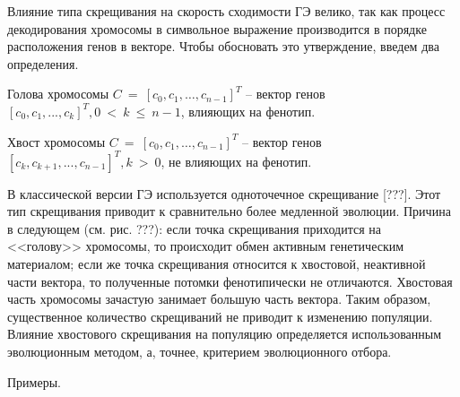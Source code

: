 Влияние типа скрещивания на скорость сходимости ГЭ велико, так как процесс декодирования хромосомы в символьное выражение производится в порядке расположения генов в векторе.
Чтобы обосновать это утверждение, введем два определения.

\begin{definition}
    Голова хромосомы $C~=~\left[c_0, c_1, \dots , c_{n-1} \right]^T$ -- вектор генов $\left[c_0, c_1, ..., c_k \right]^T, 0~<~k~\leq~n-1$, влияющих на фенотип.
\end{definition}

\begin{definition}
    Хвост хромосомы $C~=~\left[c_0, c_1, \dots , c_{n-1} \right]^T$ -- вектор генов $\left[c_k, c_{k+1}, ..., c_{n-1} \right]^T, k~>~0$, не влияющих на фенотип.
\end{definition}

В классической версии ГЭ используется одноточечное скрещивание [???]. 
Этот тип скрещивания приводит к сравнительно более медленной эволюции. %
Причина в следующем (см. рис. ???): если точка скрещивания приходится на <<голову>> хромосомы, то происходит обмен активным генетическим материалом; если же точка скрещивания относится к хвостовой, неактивной части вектора, то полученные потомки фенотипически не отличаются.
Хвостовая часть хромосомы зачастую занимает большую часть вектора.
Таким образом, существенное количество скрещиваний не приводит к изменению популяции.
Влияние хвостового скрещивания на популяцию определяется использованным эволюционным методом, а, точнее, критерием эволюционного отбора. 

Примеры.

\clearpage
